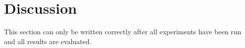 \section{Discussion}
This section can only be written correctly after all experiments have been run and all results are evaluated.
